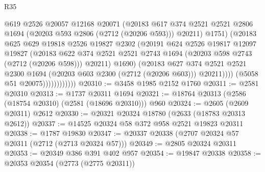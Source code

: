 \begin{lexlean}{R35}
\begin{coremodule}
                                @619
                                @2526
                                @20057
                                @12168
                                @20071
                                (@20183
                                  @617
                                  @374
                                  @2521
                                  @2521
                                  @2806
                                  @1694
                                  (@20203 @593 @2806 (@2712 (@20206 @593)))
                                  @20211)
                                @1751)
                              (@20183
                                @625
                                @629
                                @19818
                                @2526
                                @19827
                                @2302
                                (@20191
                                  @624
                                  @2526
                                  @19817
                                  @12097
                                  @19827
                                  (@20183
                                    @622
                                    @374
                                    @2521
                                    @2521
                                    @2743
                                    @1694
                                    (@20203 @598 @2743 (@2712 (@20206 @598)))
                                    @20211)
                                  @1690)
                                (@20183
                                  @627
                                  @374
                                  @2521
                                  @2521
                                  @2300
                                  @1694
                                  (@20203 @603 @2300 (@2712 (@20206 @603)))
                                  @20211))))
                          (@5058 @51 @20075))))))))))))
@20310 := @3458 @1985 @2152 @1760
@20311 := @2581 @20310
@20313 := @1737 @20311 @1694
@20321 := @18764 @20313 (@2586 (@18754 @20310) (@2581 (@18696 @20310))) @960
@20324 := @2605 (@2609 @20311) @2612
@20330 := @20321 @20324 @18780 (@2633 (@18783 @20313 @2612))
@20337 := @14525 @20324 @58 @372 @958 @2521 @19823 @20311
@20338 := @1787 @19830
@20347 := @20337 @20338 (@2707 @20324 @57 @20311 (@2712 (@2713 @20324 @57)))
@20349 := @2805 @20324 @20311
@20353 := @20349 @386 @391 @402 @957
@20354 := @19847 @20338
@20358 := @20353 @20354 (@2773 (@2775 @20311))

\end{coremodule}
\end{lexlean}
